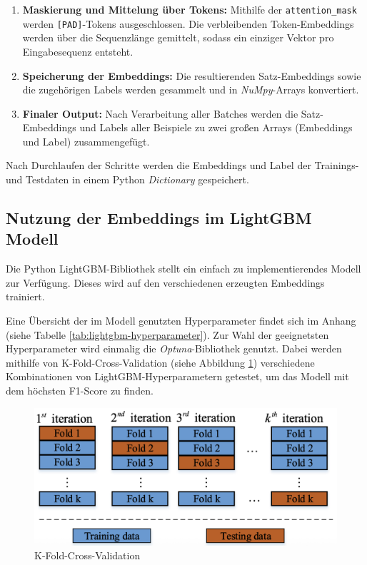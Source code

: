 \begin{enumerate}
  \item \textbf{Maskierung und Mittelung über Tokens:}  
  Mithilfe der \texttt{attention\_mask} werden \texttt{[PAD]}-Tokens ausgeschlossen. 
  Die verbleibenden Token-Embeddings werden über die Sequenzlänge gemittelt, sodass ein einziger Vektor pro Eingabesequenz entsteht.

  \item \textbf{Speicherung der Embeddings:}  
  Die resultierenden Satz-Embeddings sowie die zugehörigen Labels werden gesammelt und in \textit{NuMpy}-Arrays konvertiert.

  \item \textbf{Finaler Output:}  
  Nach Verarbeitung aller Batches werden die Satz-Embeddings und Labels aller Beispiele zu zwei großen Arrays (Embeddings und Label) zusammengefügt.
\end{enumerate} %

Nach Durchlaufen der Schritte werden die Embeddings und Label der Trainings- und Testdaten in einem Python \textit{Dictionary} gespeichert.

\subsection{Nutzung der Embeddings im LightGBM Modell}

Die Python LightGBM-Bibliothek stellt ein einfach zu implementierendes Modell zur Verfügung.
Dieses wird auf den verschiedenen erzeugten Embeddings trainiert.

Eine Übersicht der im Modell genutzten Hyperparameter findet sich im Anhang (siehe Tabelle \ref{tab:lightgbm-hyperparameter}).
Zur Wahl der geeignetsten Hyperparameter wird einmalig die \textit{Optuna}-Bibliothek genutzt.
Dabei werden mithilfe von K-Fold-Cross-Validation (siehe Abbildung \ref{fig:k-fold_cross-validation}) verschiedene Kombinationen von LightGBM-Hyperparametern getestet, 
um das Modell mit dem höchsten F1-Score zu finden.

\begin{figure}[htbp]
    \begin{center}
        \includegraphics[scale=0.4]{static/k-fold_cross-validation.png}
        \caption{\label{fig:k-fold_cross-validation} K-Fold-Cross-Validation \cite{isaac2021}}
    \end{center}
\end{figure}

